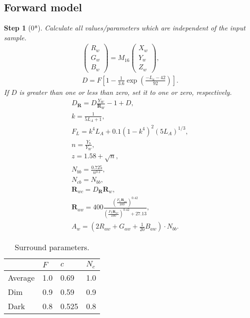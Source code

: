 \documentclass[twocolumn]{scrartcl}
\theoremstyle{named}
\newtheorem*{step}{Step}
\newcommand\rgb{\bm{R}}
\begin{document}
\subsection{Forward model}

\begin{step}[0*]
Calculate all values/parameters which are independent
of the input sample.
\begin{align*}
  &\begin{pmatrix}R_w\\G_w\\B_w\end{pmatrix}
    = M_{16}
  \begin{pmatrix}X_w\\Y_w\\Z_w\end{pmatrix},\\
  &D = F \left[1 - \tfrac{1}{3.6} \exp\left(\tfrac{-L_a-42}{92}\right)\right].
\end{align*}
If $D$ is greater than one or less than zero, set it to one or zero,
respectively.
\begin{align*}
  &D_{\rgb} = D\frac{Y_W}{\rgb_W} -1 + D,\\
  &k = \frac{1}{5L_A + 1},\\
  &F_L = k^4 L_A + 0.1 {(1-k^4)}^2 {(5L_A)}^{1/3},\\
  &n = \frac{Y_b}{Y_W},\\
  &z = 1.58 + \sqrt{n},\\
  &N_{bb} = \frac{0.725}{n^{0.2}},\\
  &N_{cb} = N_{bb},\\
  &\rgb_{wc} = D_{\rgb} \rgb_w,\\
  &\rgb_{aw} = 400
  \frac
  {{\left(\frac{F_L \rgb_{wc}}{100}\right)}^{0.42}}
  {{\left(\frac{F_L \rgb_{wc}}{100}\right)}^{0.42} + 27.13},\\
  &A_w = \left(2R_{aw} + G_{aw} + \tfrac{1}{20} B_{aw}\right) \cdot N_{bb}.
\end{align*}
\end{step}

\begin{table}\centering
  \begin{tabularx}{\linewidth}{XXXX}
  \toprule
          & $F$ & $c$   & $N_c$\\
  \midrule
  Average & 1.0 & 0.69  & 1.0\\
  Dim     & 0.9 & 0.59  & 0.9\\
  Dark    & 0.8 & 0.525 & 0.8\\
  \bottomrule
\end{tabularx}
  \caption{Surround parameters.}\label{tab:surround}
\end{table}
\end{document}
